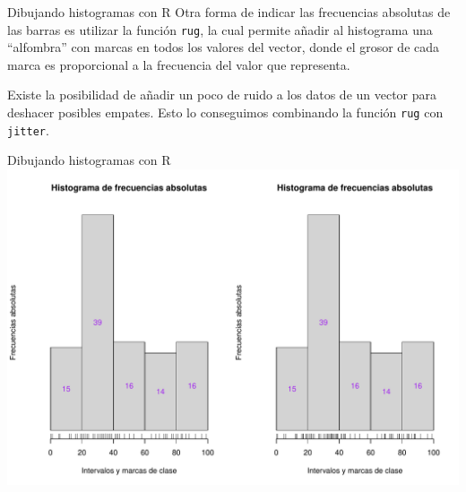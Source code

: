 \documentclass[
  ignorenonframetext,
  aspectratio=169]{beamer}
\begin{document}
\begin{frame}[fragile]{Dibujando histogramas con R}
\protect\hypertarget{dibujando-histogramas-con-r-5}{}
Otra forma de indicar las frecuencias absolutas de las barras es
utilizar la función \texttt{rug}, la cual permite añadir al histograma
una ``alfombra'' con marcas en todos los valores del vector, donde el
grosor de cada marca es proporcional a la frecuencia del valor que
representa.

Existe la posibilidad de añadir un poco de ruido a los datos de un
vector para deshacer posibles empates. Esto lo conseguimos combinando la
función \texttt{rug} con \texttt{jitter}.
\end{frame}

\begin{frame}{Dibujando histogramas con R}
\protect\hypertarget{dibujando-histogramas-con-r-6}{}
\includegraphics{Hora6_files/figure-beamer/unnamed-chunk-47-1.pdf}
\end{frame}
\end{document}
